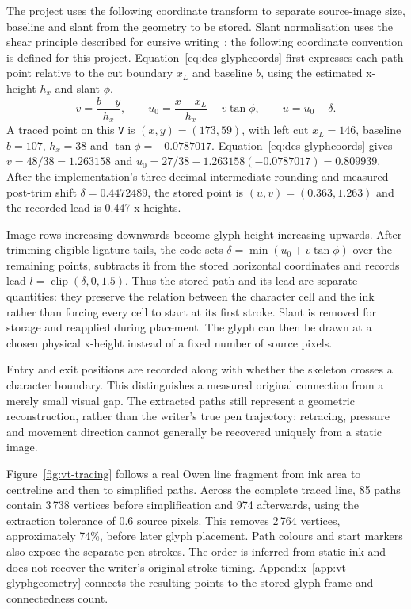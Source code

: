 The project uses the following coordinate transform to separate source-image size, baseline and slant from the geometry to be stored. Slant normalisation uses the shear principle described for cursive writing~\cite{vinciarelli2001}; the following coordinate convention is defined for this project. Equation~\ref{eq:des-glyphcoords} first expresses each path point relative to the cut boundary $x_L$ and baseline $b$, using the estimated x-height $h_x$ and slant $\phi$.
\begin{equation}
v=\frac{b-y}{h_x},\qquad
u_0=\frac{x-x_L}{h_x}-v\tan\phi,\qquad u=u_0-\delta.
\label{eq:des-glyphcoords}
\end{equation}
A traced point on this \texttt{V} is $(x,y)=(173,59)$, with left cut $x_L=146$, baseline $b=107$, $h_x=38$ and $\tan\phi=-0.0787017$. Equation~\ref{eq:des-glyphcoords} gives $v=48/38=1.263158$ and $u_0=27/38-1.263158(-0.0787017)=0.809939$. After the implementation's three-decimal intermediate rounding and measured post-trim shift $\delta=0.4472489$, the stored point is $(u,v)=(0.363,1.263)$ and the recorded lead is 0.447 x-heights.

Image rows increasing downwards become glyph height increasing upwards. After trimming eligible ligature tails, the code sets $\delta=\min(u_0+v\tan\phi)$ over the remaining points, subtracts it from the stored horizontal coordinates and records lead $l=\operatorname{clip}(\delta,0,1.5)$. Thus the stored path and its lead are separate quantities: they preserve the relation between the character cell and the ink rather than forcing every cell to start at its first stroke. Slant is removed for storage and reapplied during placement. The glyph can then be drawn at a chosen physical x-height instead of a fixed number of source pixels.

Entry and exit positions are recorded along with whether the skeleton crosses a character boundary. This distinguishes a measured original connection from a merely small visual gap. The extracted paths still represent a geometric reconstruction, rather than the writer's true pen trajectory: retracing, pressure and movement direction cannot generally be recovered uniquely from a static image.

Figure~\ref{fig:vt-tracing} follows a real Owen line fragment from ink area to centreline and then to simplified paths. Across the complete traced line, 85 paths contain 3\,738 vertices before simplification and 974 afterwards, using the extraction tolerance of 0.6 source pixels. This removes 2\,764 vertices, approximately 74\%, before later glyph placement. Path colours and start markers also expose the separate pen strokes. The order is inferred from static ink and does not recover the writer's original stroke timing. Appendix~\ref{app:vt-glyphgeometry} connects the resulting points to the stored glyph frame and connectedness count.

